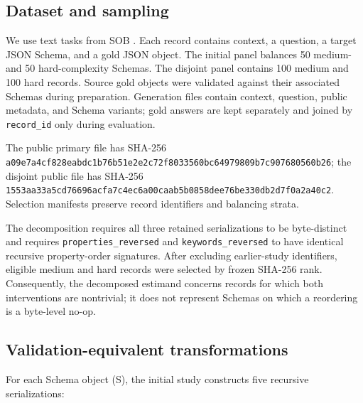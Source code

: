 \documentclass[11pt,a4paper]{article}
\begin{document}
\subsection{Dataset and sampling}
We use text tasks from SOB \citep{singh2026sob}. Each record contains context, a question, a target JSON Schema, and a gold JSON object. The initial panel balances 50 medium- and 50 hard-complexity Schemas. The disjoint panel contains 100 medium and 100 hard records. Source gold objects were validated against their associated Schemas during preparation. Generation files contain context, question, public metadata, and Schema variants; gold answers are kept separately and joined by \texttt{record\_id} only during evaluation.

The public primary file has SHA-256 \texttt{a09e7a4c\allowbreak{}f828eabd\allowbreak{}c1b76b51\allowbreak{}e2e2c72f\allowbreak{}8033560b\allowbreak{}c6497980\allowbreak{}9b7c9076\allowbreak{}80560b26}; the disjoint public file has SHA-256 \texttt{1553aa33\allowbreak{}a5cd7669\allowbreak{}6acfa7c4\allowbreak{}ec6a00ca\allowbreak{}ab5b0858\allowbreak{}dee76be3\allowbreak{}30db2d7f\allowbreak{}0a2a40c2}. Selection manifests preserve record identifiers and balancing strata.

The decomposition requires all three retained serializations to be byte-distinct and requires \texttt{properties\_reversed} and \texttt{keywords\_reversed} to have identical recursive property-order signatures. After excluding earlier-study identifiers, eligible medium and hard records were selected by frozen SHA-256 rank. Consequently, the decomposed estimand concerns records for which both interventions are nontrivial; it does not represent Schemas on which a reordering is a byte-level no-op.

\subsection{Validation-equivalent transformations}
For each Schema object (S), the initial study constructs five recursive serializations:
\end{document}
